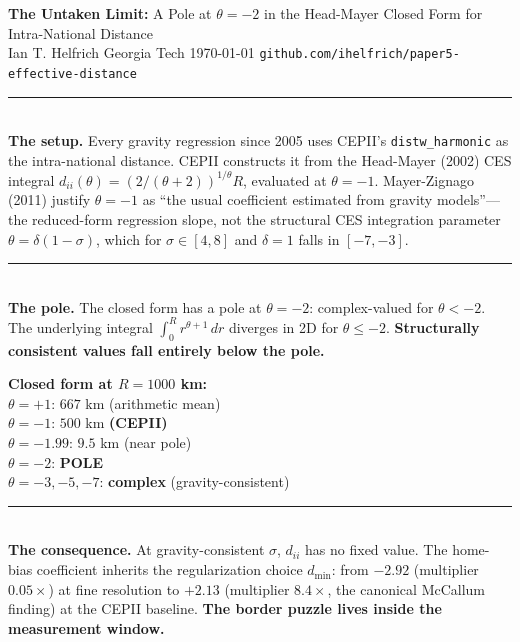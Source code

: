 \documentclass[9pt, letterpaper, landscape]{extarticle}
\begin{document}
\begin{center}
{\large\bfseries The Untaken Limit:} A Pole at $\theta = -2$ in the Head-Mayer Closed Form for Intra-National Distance\\
{\footnotesize Ian T. Helfrich \;{\color{DIM}\textbar}\; Georgia Tech \;{\color{DIM}\textbar}\; \today \;{\color{DIM}\textbar}\; \texttt{github.com/ihelfrich/paper5-effective-distance}}
\end{center}

\vspace{-4pt}

\noindent\begin{minipage}[t]{0.36\textwidth}
{\color{RUST}\rule{\textwidth}{0.6pt}}\\
\textbf{\color{RUST}The setup.}
Every gravity regression since 2005 uses CEPII's \texttt{distw\_harmonic} as
the intra-national distance. CEPII constructs it from the Head-Mayer (2002)
CES integral $d_{ii}(\theta) = (2/(\theta+2))^{1/\theta} R$, evaluated at
$\theta = -1$. Mayer-Zignago (2011) justify $\theta = -1$ as ``the usual
coefficient estimated from gravity models''---the reduced-form regression
slope, not the structural CES integration parameter $\theta = \delta(1-\sigma)$,
which for $\sigma \in [4,8]$ and $\delta = 1$ falls in $[-7, -3]$.\\[3pt]

{\color{RUST}\rule{\textwidth}{0.6pt}}\\
\textbf{\color{RUST}The pole.}
The closed form has a pole at $\theta = -2$: complex-valued for $\theta < -2$.
The underlying integral $\int_0^R r^{\theta+1}\, dr$ diverges in 2D for
$\theta \leq -2$. \textbf{Structurally consistent values fall entirely
below the pole.}\\[3pt]

\begin{tcolorbox}[colback=GOLD!5, colframe=GOLD, boxrule=0.5pt,
  arc=2pt, left=3pt, right=3pt, top=2pt, bottom=2pt]
{\footnotesize\bfseries Closed form at $R = 1000$ km:}\\[1pt]
{\footnotesize
$\theta = +1$:\; $667$ km (arithmetic mean)\\
$\theta = -1$:\; $500$ km\; {\color{RUST}\textbf{(CEPII)}}\\
$\theta = -1.99$:\; $9.5$ km (near pole)\\
$\theta = -2$:\; \textbf{\color{RUST}POLE}\\
$\theta = -3, -5, -7$:\; \textbf{\color{RUST}complex} (gravity-consistent)}
\end{tcolorbox}

{\color{RUST}\rule{\textwidth}{0.6pt}}\\
\textbf{\color{RUST}The consequence.}
At gravity-consistent $\sigma$, $d_{ii}$ has no fixed value. The
home-bias coefficient inherits the regularization choice $d_{\min}$:
from $-2.92$ (multiplier $0.05\times$) at fine resolution to $+2.13$
(multiplier $8.4\times$, the canonical McCallum finding) at the CEPII
baseline. \textbf{The border puzzle lives inside the measurement window.}

\end{minipage}
\end{document}
